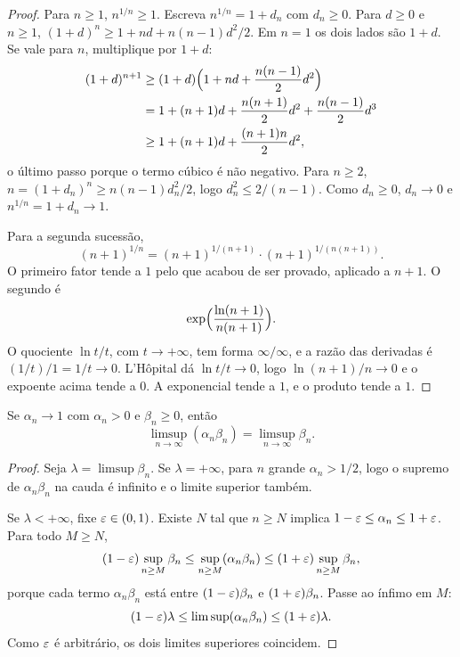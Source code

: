 \documentclass[11pt,a4paper]{article}
\begin{document}
\begin{proof}
Para \(n\ge 1\), \(n^{1/n}\ge 1\). Escreva \(n^{1/n}=1+d_n\) com \(d_n\ge 0\). Para \(d\ge 0\) e \(n\ge 1\), \((1+d)^n\ge 1+nd+n(n-1)d^2/2\). Em \(n=1\) os dois lados são \(1+d\). Se vale para \(n\), multiplique por \(1+d\):
\begin{align*}
(1+d)^{n+1}
&\ge(1+d)\Bigl(1+nd+\frac{n(n-1)}{2}d^2\Bigr)\\
&=1+(n+1)d+\frac{n(n+1)}{2}d^2+\frac{n(n-1)}{2}d^3\\
&\ge 1+(n+1)d+\frac{(n+1)n}{2}d^2,
\end{align*}
o último passo porque o termo cúbico é não negativo. Para \(n\ge 2\), \(n=(1+d_n)^n\ge n(n-1)d_n^2/2\), logo \(d_n^2\le 2/(n-1)\). Como \(d_n\ge 0\), \(d_n\to 0\) e \(n^{1/n}=1+d_n\to 1\).

Para a segunda sucessão,
\[
(n+1)^{1/n}=(n+1)^{1/(n+1)}\cdot(n+1)^{1/(n(n+1))}.
\]
O primeiro fator tende a \(1\) pelo que acabou de ser provado, aplicado a \(n+1\). O segundo é
\[
\exp\Bigl(\frac{\ln(n+1)}{n(n+1)}\Bigr).
\]
O quociente \(\ln t/t\), com \(t\to+\infty\), tem forma \(\infty/\infty\), e a razão das derivadas é \((1/t)/1=1/t\to 0\). L'Hôpital dá \(\ln t/t\to 0\), logo \(\ln(n+1)/n\to 0\) e o expoente acima tende a \(0\). A exponencial tende a \(1\), e o produto tende a \(1\).
\end{proof}

\begin{lema}
\label{lem:limsup-produto}
Se \(\alpha_n\to 1\) com \(\alpha_n>0\) e \(\beta_n\ge 0\), então
\[
\limsup_{n\to\infty}(\alpha_n\beta_n)=\limsup_{n\to\infty}\beta_n.
\]
\end{lema}

\begin{proof}
Seja \(\lambda=\limsup\beta_n\). Se \(\lambda=+\infty\), para \(n\) grande \(\alpha_n>1/2\), logo o supremo de \(\alpha_n\beta_n\) na cauda é infinito e o limite superior também.

Se \(\lambda<+\infty\), fixe \(\varepsilon\in(0,1)\). Existe \(N\) tal que \(n\ge N\) implica \(1-\varepsilon\le\alpha_n\le 1+\varepsilon\). Para todo \(M\ge N\),
\[
(1-\varepsilon)\sup_{n\ge M}\beta_n
\le\sup_{n\ge M}(\alpha_n\beta_n)
\le(1+\varepsilon)\sup_{n\ge M}\beta_n,
\]
porque cada termo \(\alpha_n\beta_n\) está entre \((1-\varepsilon)\beta_n\) e \((1+\varepsilon)\beta_n\). Passe ao ínfimo em \(M\):
\[
(1-\varepsilon)\lambda\le\limsup(\alpha_n\beta_n)\le(1+\varepsilon)\lambda.
\]
Como \(\varepsilon\) é arbitrário, os dois limites superiores coincidem.
\end{proof}
\end{document}
